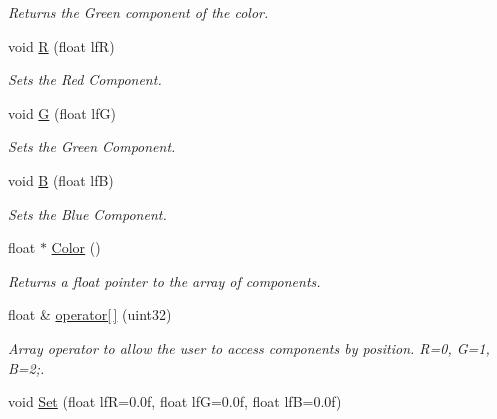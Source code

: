 \begin{DoxyCompactItemize}
\begin{DoxyCompactList}\small\item\em Returns the Green component of the color. \end{DoxyCompactList}\item 
\hypertarget{classc_r_g_b_a8ec1a9e2678f1cdc1d8c7bd85273dcfa}{
void \hyperlink{classc_r_g_b_a8ec1a9e2678f1cdc1d8c7bd85273dcfa}{R} (float lfR)}
\label{classc_r_g_b_a8ec1a9e2678f1cdc1d8c7bd85273dcfa}

\begin{DoxyCompactList}\small\item\em Sets the Red Component. \end{DoxyCompactList}\item 
\hypertarget{classc_r_g_b_aaccf70ef2ddad7617f123d84e6242392}{
void \hyperlink{classc_r_g_b_aaccf70ef2ddad7617f123d84e6242392}{G} (float lfG)}
\label{classc_r_g_b_aaccf70ef2ddad7617f123d84e6242392}

\begin{DoxyCompactList}\small\item\em Sets the Green Component. \end{DoxyCompactList}\item 
\hypertarget{classc_r_g_b_a5c7ceecce5f8c558cebf7bd214d304db}{
void \hyperlink{classc_r_g_b_a5c7ceecce5f8c558cebf7bd214d304db}{B} (float lfB)}
\label{classc_r_g_b_a5c7ceecce5f8c558cebf7bd214d304db}

\begin{DoxyCompactList}\small\item\em Sets the Blue Component. \end{DoxyCompactList}\item 
\hypertarget{classc_r_g_b_a4e1d05eb87499169150216067361c53c}{
float $\ast$ \hyperlink{classc_r_g_b_a4e1d05eb87499169150216067361c53c}{Color} ()}
\label{classc_r_g_b_a4e1d05eb87499169150216067361c53c}

\begin{DoxyCompactList}\small\item\em Returns a float pointer to the array of components. \end{DoxyCompactList}\item 
\hypertarget{classc_r_g_b_ad24f57ecec4046a4580436f2c63462cb}{
float \& \hyperlink{classc_r_g_b_ad24f57ecec4046a4580436f2c63462cb}{operator\mbox{[}$\,$\mbox{]}} (uint32)}
\label{classc_r_g_b_ad24f57ecec4046a4580436f2c63462cb}

\begin{DoxyCompactList}\small\item\em Array operator to allow the user to access components by position. R=0, G=1, B=2;. \end{DoxyCompactList}\item 
\hypertarget{classc_r_g_b_a59ec50d713ed372b57125ef1f5c58d06}{
void \hyperlink{classc_r_g_b_a59ec50d713ed372b57125ef1f5c58d06}{Set} (float lfR=0.0f, float lfG=0.0f, float lfB=0.0f)}
\label{classc_r_g_b_a59ec50d713ed372b57125ef1f5c58d06}


\end{DoxyCompactItemize}
